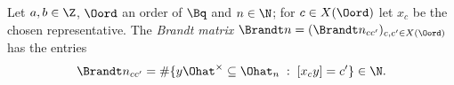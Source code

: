 Let $a,b\in\Z$, $\Oord$ an order of $\Bq$ and $n\in\N$; for $c\in X(\Oord)$ let $x_c$ be the chosen representative. The \emph{Brandt
matrix} $\Brandt n=(\Brandt n_{cc'})_{c,c'\in X(\Oord)}$ has the entries
\[
  \Brandt n_{cc'}=\#\{y\Ohat^\times\subseteq\Ohat_n\;:\;[x_cy]=c'\}\in\N.
\]
